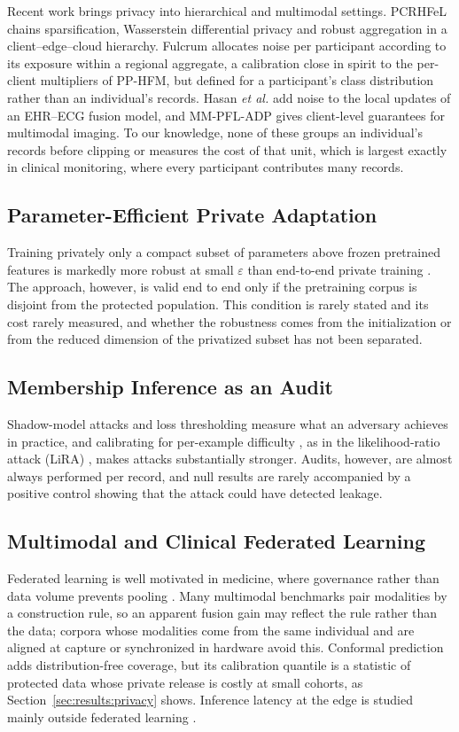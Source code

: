 Recent work brings privacy into hierarchical and multimodal settings.
PCRHFeL \cite{ref34} chains sparsification, Wasserstein differential privacy
and robust aggregation in a client--edge--cloud hierarchy. Fulcrum
\cite{ref37} allocates noise per participant according to its exposure within
a regional aggregate, a calibration close in spirit to the per-client
multipliers of PP-HFM, but defined for a participant's class distribution
rather than an individual's records. Hasan \emph{et al.} \cite{ref35} add
noise to the local updates of an EHR--ECG fusion model, and MM-PFL-ADP
\cite{ref36} gives client-level guarantees for multimodal imaging. To our
knowledge, none of these groups an individual's records before clipping or
measures the cost of that unit, which is largest exactly in clinical
monitoring, where every participant contributes many records.

\subsection{Parameter-Efficient Private Adaptation}
Training privately only a compact subset of parameters above frozen
pretrained features is markedly more robust at small $\varepsilon$ than
end-to-end private training \cite{ref12, ref13}. The approach, however, is
valid end to end only if the pretraining corpus is disjoint from the
protected population. This condition is rarely stated and its cost rarely
measured, and whether the robustness comes from the initialization or from
the reduced dimension of the privatized subset has not been separated.

\subsection{Membership Inference as an Audit}
Shadow-model attacks \cite{ref14} and loss thresholding \cite{ref15} measure
what an adversary achieves in practice, and calibrating for per-example
difficulty \cite{ref16}, as in the likelihood-ratio attack (LiRA)
\cite{ref17}, makes attacks substantially stronger. Audits, however, are
almost always performed per record, and null results are rarely accompanied
by a positive control showing that the attack could have detected leakage.

\subsection{Multimodal and Clinical Federated Learning}
Federated learning is well motivated in medicine, where governance rather
than data volume prevents pooling \cite{ref18, ref19}. Many multimodal
benchmarks pair modalities by a construction rule, so an apparent fusion gain
may reflect the rule rather than the data; corpora whose modalities come from
the same individual and are aligned at capture \cite{ref20} or synchronized
in hardware \cite{ref21} avoid this. Conformal prediction \cite{ref22, ref23}
adds distribution-free coverage, but its calibration quantile is a statistic
of protected data whose private release \cite{ref24, ref30} is costly at
small cohorts, as Section~\ref{sec:results:privacy} shows. Inference latency
at the edge is studied mainly outside federated learning \cite{ref25, ref26}.

